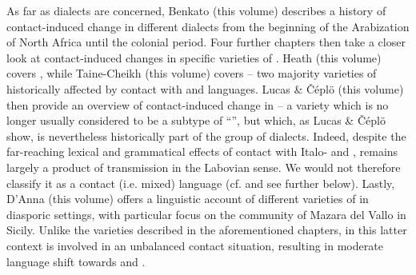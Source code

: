 \documentclass[output=paper]{langsci/langscibook}
\begin{document}
As far as  dialects are concerned, Benkato (this volume) describes a history of contact-induced change in different  dialects from the beginning of the {Arabization} of North Africa until the {colonial} period. Four further chapters then take a closer look at contact-induced changes in specific varieties of  . Heath (this volume) covers , while Taine-Cheikh (this volume) covers  -- two majority varieties of  historically affected by contact with  and  languages. Lucas \& Čéplö (this volume) then provide an overview of contact-induced change in  -- a variety which is no longer usually considered to be a subtype of ``'', but which, as Lucas \& Čéplö show, is nevertheless historically part of the  group of  dialects. Indeed, despite the far-reaching lexical and grammatical effects of contact with Italo- and ,  remains largely a product of {transmission} in the Labovian sense. We would not therefore classify it as a contact (i.e. mixed) language (cf. \citealt{stolz2003} and see further below). Lastly, D’Anna (this volume) offers a linguistic account of different varieties of  in diasporic settings, with particular focus on the  community of {Mazara del Vallo} in {Sicily}. Unlike the  varieties described in the aforementioned chapters, in this latter context  is involved in an unbalanced contact situation, resulting in moderate {language shift} towards  and .
\end{document}

